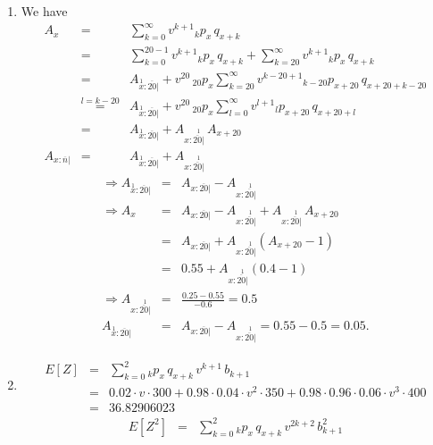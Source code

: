\documentclass[11pt,fleqn,oneside]{book}
\begin{document}
\begin{enumerate}
\item We have
\begin{eqnarray*}
A_x &=&  \sum_{k=0}^{\infty} v^{k+1} {_kp_x}\,{q_{x+k}} \\
&=&  \sum_{k=0}^{20-1} v^{k+1} {_kp_x}\,{q_{x+k}} +  \sum_{k=20}^{\infty} v^{k+1} {_kp_x}\,{q_{x+k}} \\
&=&  {A_{\stackrel{1}{x}:\overline{20}|}} + v^{20}\,{_{20}p_x}  \sum_{k=20}^{\infty} v^{k-20+1} {_{k-20}p_{x+20}}\,{q_{x+20+k-20}}\\
&\stackrel{l=k-20}{=} &  {A_{\stackrel{1}{x}:\overline{20}|}} + v^{20}\,{_{20}p_x}  \sum_{l=0}^{\infty} v^{l+1} {_{l}p_{x+20}}\,{q_{x+20+l}}\\
&=&   {A_{\stackrel{1}{x}:\overline{20}|}} + {A_{x:\stackrel{1}{\overline{20}|}}}  \,A_{x+20}\\
 {A_{x:\overline{n}|}} &=& {A_{\stackrel{1}{x}:\overline{20}|}}  +  {A_{x:\stackrel{1}{\overline{20}|}}}  
 \end{eqnarray*}
\begin{eqnarray*}
 \Rightarrow {A_{\stackrel{1}{x}:\overline{20}|}} &=& {A_{x:\overline{20}|}}  - {A_{x:\stackrel{1}{\overline{20}|}}} \\
\Rightarrow 
A_x &=& {A_{x:\overline{20}|}}  - {A_{x:\stackrel{1}{\overline{20}|}}} + {A_{x:\stackrel{1}{\overline{20}|}}  }\,A_{x+20}\\
&=& {A_{x:\overline{20}|}}  + {A_{x:\stackrel{1}{\overline{20}|}}} \left( A_{x+20} - 1\right)\\
&=& 0.55 + {A_{x:\stackrel{1}{\overline{20}|}} }\left(0.4 - 1\right)\\
\Rightarrow
{A_{x:\stackrel{1}{\overline{20}|}}} &=& \frac{0.25-0.55}{-0.6} = 0.5\\
  {A_{\stackrel{1}{x}:\overline{20}|}} &=&  {A_{x:\overline{20}|}} -  {A_{x:\stackrel{1}{\overline{20}|}}} =
  0.55 - 0.5 = 0.05.
  \end{eqnarray*}
\item
 \begin{eqnarray*}
 E[Z] &=& \sum_{k=0}^2 {_kp_x} \, {q_{x+k}}\,v^{k+1} \, b_{k+1}\\
 &=& 0.02 \cdot v \cdot 300 + 0.98\cdot 0.04 \cdot v^2 \cdot 350 + 0.98\cdot 0.96 \cdot 0.06 \cdot v^3 \cdot 400\\
 &=& 36.82906023
 \end{eqnarray*}
 \begin{eqnarray*}
 E[Z^2] &=& \sum_{k=0}^2 {_kp_x} \, {q_{x+k}}\,v^{2k+2} \, b_{k+1}^2\\

\end{eqnarray*}
\end{enumerate}
\end{document}
